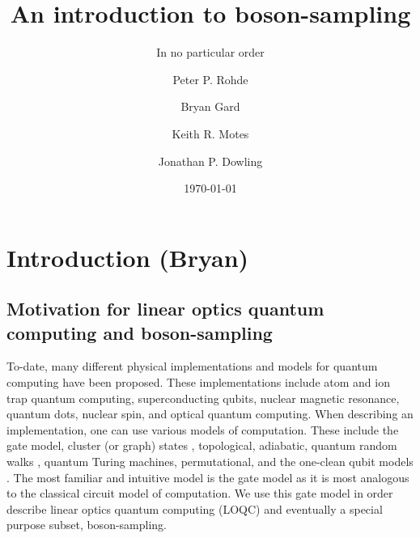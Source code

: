 \documentclass[aps,pra,twocolumn,amsmath,amssymb,nofootinbib,superscriptaddress]{revtex4}
\begin{document}


%
% 

\title{An introduction to boson-sampling}

%
%

\author{In no particular order}

\author{Peter P. Rohde}

\author{Bryan Gard}

\author{Keith R. Motes}

\author{Jonathan P. Dowling}

\date{\today}

\frenchspacing

%
%

\begin{abstract}
\end{abstract}

\maketitle

\section{Introduction (Bryan)}

\subsection{Motivation for linear optics quantum computing and boson-sampling}

To-date, many different physical implementations and models for quantum computing have been proposed. These implementations include atom and ion trap quantum computing, superconducting qubits, nuclear magnetic resonance, quantum dots, nuclear spin, and optical quantum computing. When describing an implementation, one can use various models of computation. These include the gate model, cluster (or graph) states \cite{bib:Raussendorf01, bib:Raussendorf03}, topological, adiabatic, quantum random walks \cite{bib:ADZ}, quantum Turing machines, permutational, and the one-clean qubit models \cite{jordan}. The most familiar and intuitive model is the gate model as it is most analogous to the classical circuit model of computation. We use this gate model in order describe linear optics quantum computing (LOQC) and eventually a special purpose subset, boson-sampling.
\end{document}
